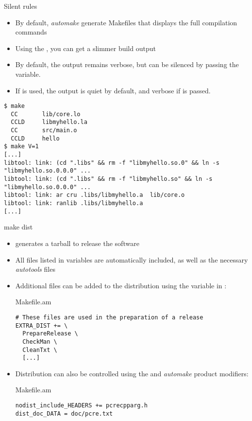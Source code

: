 \begin{frame}[fragile]{Silent rules}

  \begin{itemize}
  \item By default, {\em automake} generate Makefiles that displays
    the full compilation commands
  \item Using the , you can get a slimmer build
    output
  \item By default, the output remains verbose, but can be silenced by
    passing the  variable.
  \item If  is used, the output is quiet
    by default, and verbose if  is passed.
  \end{itemize}

  \begin{block}{}
\begin{verbatim}
$ make
  CC       lib/core.lo
  CCLD     libmyhello.la
  CC       src/main.o
  CCLD     hello
$ make V=1
[...]
libtool: link: (cd ".libs" && rm -f "libmyhello.so.0" && ln -s "libmyhello.so.0.0.0" ...
libtool: link: (cd ".libs" && rm -f "libmyhello.so" && ln -s "libmyhello.so.0.0.0" ...
libtool: link: ar cru .libs/libmyhello.a  lib/core.o
libtool: link: ranlib .libs/libmyhello.a
[...]
\end{verbatim}
  \end{block}

\end{frame}

\begin{frame}[fragile]{make dist}

  \begin{itemize}
  \item {} generates a tarball to release the software
  \item All files listed in  variables are
    automatically included, as well as the necessary {\em autotools}
    files
  \item Additional files can be added to the distribution using the
     variable in :
\begin{block}{Makefile.am}
\begin{verbatim}
# These files are used in the preparation of a release
EXTRA_DIST += \
  PrepareRelease \
  CheckMan \
  CleanTxt \
  [...]
\end{verbatim}
\end{block}
\item Distribution can also be controlled using the  and
   {\em automake} product modifiers:
\begin{block}{Makefile.am}
\begin{verbatim}
nodist_include_HEADERS += pcrecpparg.h
dist_doc_DATA = doc/pcre.txt
\end{verbatim}
\end{block}

\end{itemize}

\end{frame}

